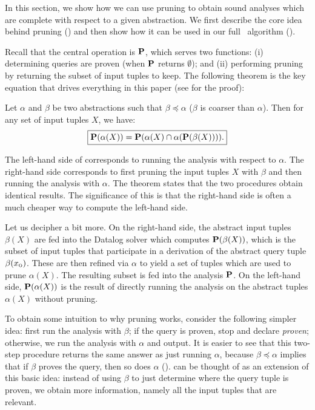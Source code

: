 
In this section, we show how we can use pruning to obtain sound analyses which
are complete with respect to a given abstraction.  We first describe the core
idea behind pruning () and then show how it can be used in our
full \PR\ algorithm ().


Recall that the central operation is $\mathbf{P}$, which serves two functions: (i)
determining queries are proven (when $\mathbf{P}$ returns $\emptyset$); and (ii)
performing pruning by returning the subset of input tuples to keep.
The following theorem is the key equation that drives everything in this paper (see  for the proof):

\begin{theorem}
\label{thm:master}
Let $\alpha$ and $\beta$ be two abstractions such that $\beta \preceq \alpha$
($\beta$ is coarser than $\alpha$).
Then for any set of input tuples $X$, we have:
\begin{align}
\label{eqn:master}
\boxed{
\mathbf{P}(\alpha(X)) = \mathbf{P}(\alpha(X) \cap \alpha(\mathbf{P}(\beta(X)))).
}
\end{align}
\end{theorem}

The left-hand side of  corresponds to running the analysis with respect to $\alpha$.
The right-hand side corresponds to first pruning the input tuples $X$
with $\beta$ and then running the analysis with $\alpha$.
The theorem states that the two procedures obtain identical results.
The significance of this is that the right-hand side is often a much cheaper
way to compute the left-hand side.

Let us decipher  a bit more.
On the right-hand side,
the abstract input tuples $\beta(X)$
are fed into the Datalog solver which computes $\mathbf{P}(\beta(X))$,
which is the subset of input tuples that participate in a derivation of the abstract query tuple $\beta(x_\text{\sc o})$.
These are then refined via $\alpha$ to yield a set of tuples which are used to prune $\alpha(X)$.
The resulting subset is fed into the analysis $\mathbf{P}$.
On the left-hand side, $\mathbf{P}(\alpha(X))$ is the result of directly running the analysis
on the abstract tuples $\alpha(X)$ without pruning.

To obtain some intuition to why pruning works,
consider the following simpler idea:
first run the analysis with $\beta$; if the query is proven, stop and declare {\em proven}; otherwise, we run the analysis
with $\alpha$ and output.
It is easier to see that this two-step procedure returns the same answer as just running $\alpha$,
because $\beta \preceq \alpha$ implies that if $\beta$ proves the query, then so does $\alpha$
().
 can be thought of as an extension of this basic idea:
instead of using $\beta$ to just determine where the query tuple is proven,
we obtain more information, namely all the input tuples that are relevant.

